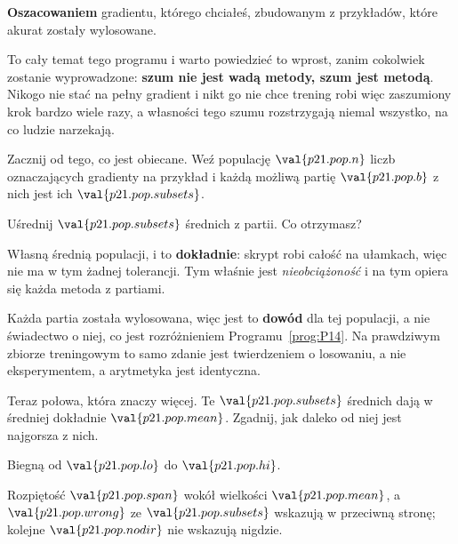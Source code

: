 \begin{fr}
\begin{ansblock}
\textbf{Oszacowaniem} gradientu, którego chciałeś, zbudowanym z przykładów,
które akurat zostały wylosowane.
\end{ansblock}

To cały temat tego programu i warto powiedzieć to wprost, zanim cokolwiek
zostanie wyprowadzone: \textbf{szum nie jest wadą metody, szum jest metodą}.
Nikogo nie stać na pełny gradient i nikt go nie chce \dash{} trening robi więc
zaszumiony krok bardzo wiele razy, a własności tego szumu rozstrzygają niemal
wszystko, na co ludzie narzekają.

\end{fr}

\begin{fr}
Zacznij od tego, co jest obiecane. Weź populację $\val{p21.pop.n}$ liczb
oznaczających gradienty na przykład i każdą możliwą partię
$\val{p21.pop.b}$ z nich \dash{} jest ich $\val{p21.pop.subsets}$.

Uśrednij $\val{p21.pop.subsets}$ średnich z partii. Co otrzymasz?
\nextframe
\end{fr}

\begin{fr}
Własną średnią populacji, i to \textbf{dokładnie}: skrypt robi całość na
ułamkach, więc nie ma w tym żadnej tolerancji. Tym właśnie jest
\emph{nieobciążoność} i na tym opiera się każda metoda z partiami.

\begin{note}
Każda partia została wylosowana, więc jest to \textbf{dowód} dla tej populacji,
a nie świadectwo o niej, co jest rozróżnieniem Programu~\ref{prog:P14}. Na
prawdziwym zbiorze treningowym to samo zdanie jest twierdzeniem o losowaniu, a
nie eksperymentem, a arytmetyka jest identyczna.
\end{note}

Teraz połowa, która znaczy więcej. Te $\val{p21.pop.subsets}$ średnich dają w
średniej dokładnie $\val{p21.pop.mean}$. Zgadnij, jak daleko od niej jest
najgorsza z nich.
\dotline
\nextframe
\end{fr}

\begin{fr}
\begin{ansblock}
Biegną od $\val{p21.pop.lo}$ do $\val{p21.pop.hi}$.
\end{ansblock}


Rozpiętość $\val{p21.pop.span}$ wokół wielkości $\val{p21.pop.mean}$, a
$\val{p21.pop.wrong}$ ze $\val{p21.pop.subsets}$ wskazują w przeciwną stronę;
kolejne $\val{p21.pop.nodir}$ nie wskazują nigdzie.
\end{fr}

